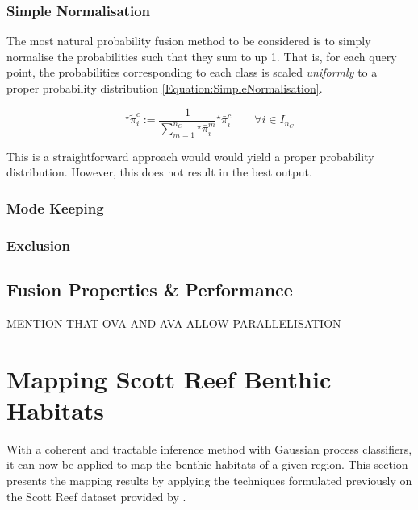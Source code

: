 			\subsubsection{Simple Normalisation}
			\label{BenthicHabitatMapping:Classification:ProbabilityFusion:SimpleNormalisation}
				
				The most natural probability fusion method to be considered is to simply normalise the probabilities such that they sum to up 1. That is, for each query point, the probabilities corresponding to each class is scaled \textit{uniformly} to a proper probability distribution \eqref{Equation:SimpleNormalisation}.
				
				\begin{equation}
					{^{\star}}\tilde{\pi}^{c}_{i} := \frac{1}{\sum_{m = 1}^{n_{C}} {^{\star}}\bar{\pi}^{m}_{i}} {^{\star}}\bar{\pi}^{c}_{i} \qquad \forall i \in I_{n_{C}}
				\label{Equation:SimpleNormalisation}
				\end{equation}				
				
				This is a straightforward approach would would yield a proper probability distribution. However, this does not result in the best output.
				
			\subsubsection{Mode Keeping}
			\label{BenthicHabitatMapping:Classification:ProbabilityFusion:ModeKeeping}
				
			\subsubsection{Exclusion}
			\label{BenthicHabitatMapping:Classification:ProbabilityFusion:Exclusion}
			
		\subsection{Fusion Properties \& Performance}
		\label{BenthicHabitatMapping:Classification:Performance}
			
				MENTION THAT OVA AND AVA ALLOW PARALLELISATION
				
	\section{Mapping Scott Reef Benthic Habitats}
	\label{BenthicHabitatMapping:ScottReef}

		With a coherent and tractable inference method with Gaussian process classifiers, it can now be applied to map the benthic habitats of a given region. This section presents the mapping results by applying the techniques formulated previously on the Scott Reef dataset provided by \cite{IMOS}.  

